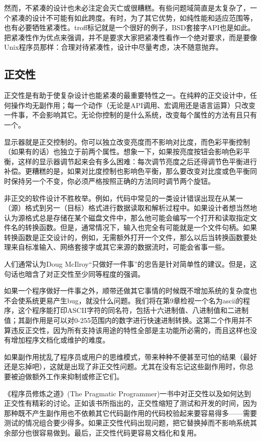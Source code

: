 \documentclass[12pt,oneside]{book}
\begin{document}
\begin{common-format}
然而，不紧凑的设计也未必注定会灭亡或很糟糕。有些问题域简直是太复杂了，一个紧凑的设计不可能有如此跨度。有时，为了其它优势，如纯性能和适应范围等，也有必要牺牲紧凑性。troff标记就是一个很好的例子，BSD套接字API也是如此。把紧凑性作为优点来强调，并不是要求大家把紧凑性看作一个绝对要求，而是要像Unix程序员那样：合理对待紧凑性，设计中尽量考虑，决不随意抛弃。

\subsection{正交性}
正交性是有助于使复杂设计也能紧凑的最重要特性之一。在纯粹的正交设计中，任何操作均无副作用；每一个动作（无论是API调用、宏调用还是语言运算）只改变一件事，不会影响其它。无论你控制的是什么系统，改变每个属性的方法有且只有一个。

显示器就是正交控制的。你可以独立改变亮度而不影响对比度，而色彩平衡控制（如果有的话）也独立于前两个属性。想象一下，如果按亮度按钮会影响色彩平衡，这样的显示器调节起来会有多么困难：每次调节亮度之后还得调节色平衡进行补偿。更糟糕的是，如果对比度控制也影响色平衡，那么要改变对比度或色平衡同时保持另一个不变，你必须严格按照正确的方法同时调节两个旋钮。

非正交的软件设计不胜枚举。例如，代码中常见的一类设计错误出现在从某一（源）格式到另一（目标）格式进行数据读取和解析过程中。如果设计者想当然地认为源格式总是存储在某个磁盘文件中，那么他可能会编写一个打开和读取指定文件名的转换函数。但是，通常情况下，输入也完全有可能就是一个文件句柄。如果转换函数是正交设计的，例如，无需额外打开一个文件，那么以后当转换函数要处理来自标准输入、网络套接字或其它来源的数据流时，可能会省事一些。

人们通常认为Doug McIlroy“只做好一件事”的忠告是针对简单性的建议。但是，这句话也暗含了对正交性至少同等程度的强调。

如果一个程序做好一件事之外，顺带还做其它事情的时候既不增加系统的复杂度也不会使系统更易产生bug，就没什么问题。我们将在第9章检视一个名为ascii的程序，这个程序能打印ASCII字符的同名符，包括十六进制值、八进制值和二进制值；其副作用是可以对0-255范围内的数字进行快速进制转换。这第二个作用并不算违反正交性，因为所有支持该用途的特性全部是主功能所必需的，而且这样也没有增加程序文档化或维护的难度。

如果副作用扰乱了程序员或用户的思维模式，带来种种不便甚至可怕的结果（最好还是忘掉吧），这就是出现了非正交性问题。尤其在没有忘记这些副作用时，你总要被迫做额外工作来抑制或修正它们。

《程序员修炼之道》(The Pragmatic Programmer)\cite{Hunt-Thomas}一书中对正交性以及如何达到正交性有精彩的讨论。正如该书所指出的，正交性缩短了测试和开发的时间，因为那种既不产生副作用也不依赖其它代码副作用的代码校验起来要容易得多——需要测试的情况组合要少得多。如果正交性代码出现问题，把它替换掉而不影响系统其余部分也很容易做到。最后，正交性代码更容易文档化和复用。


\end{common-format}
\end{document}
